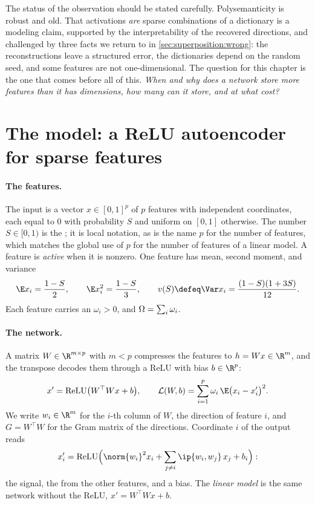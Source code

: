 \begin{refsection}
The status of the observation should be stated carefully. Polysemanticity is robust and old. That activations \emph{are} sparse combinations of a dictionary is a modeling claim, supported by the interpretability of the recovered directions, and challenged by three facts we return to in \cref{sec:superposition:wrong}: the reconstructions leave a structured error, the dictionaries depend on the random seed, and some features are not one-dimensional. The question for this chapter is the one that comes before all of this. \emph{When and why does a network store more features than it has dimensions, how many can it store, and at what cost?}

\section{The model: a ReLU autoencoder for sparse features}\label{sec:superposition:model}

\paragraph{The features.} The input is a vector $x\in[0,1]^p$ of $p$ features with independent coordinates, each equal to $0$ with probability $S$ and uniform on $[0,1]$ otherwise. The number $S\in[0,1)$ is the ; it is local notation, as is the name $p$ for the number of features, which matches the global use of $p$ for the number of features of a linear model. A feature is \emph{active} when it is nonzero. One feature has mean, second moment, and variance
\begin{equation}\label{eq:superposition:moments}
  \E x_i=\frac{1-S}2,\qquad \E x_i^2=\frac{1-S}3,\qquad \supv\defeq\Var x_i=\frac{(1-S)(1+3S)}{12}.
\end{equation}
Each feature carries an  $\omega_i>0$, and $\Omega=\sum_i\omega_i$.

\paragraph{The network.} A matrix $W\in\R^{m\times p}$ with $m<p$ compresses the features to $h=Wx\in\R^m$, and the transpose decodes them through a ReLU with bias $b\in\R^p$:
\begin{equation}\label{eq:superposition:model}
  x'=\relu\bigl(W^\top Wx+b\bigr),\qquad \Loss(W,b)=\sum_{i=1}^p\omega_i\,\E\bigl(x_i-x'_i\bigr)^2 .
\end{equation}
We write $w_i\in\R^m$ for the $i$-th column of $W$, the direction of feature $i$, and $G=W^\top W$ for the Gram matrix of the directions. Coordinate $i$ of the output reads
\[
  x'_i=\relu\Bigl(\norm{w_i}^2x_i+\sum_{j\ne i}\ip{w_i,w_j}\,x_j+b_i\Bigr):
\]
the signal, the  from the other features, and a bias. The \emph{linear model} is the same network without the ReLU, $x'=W^\top Wx+b$.


\end{refsection}
